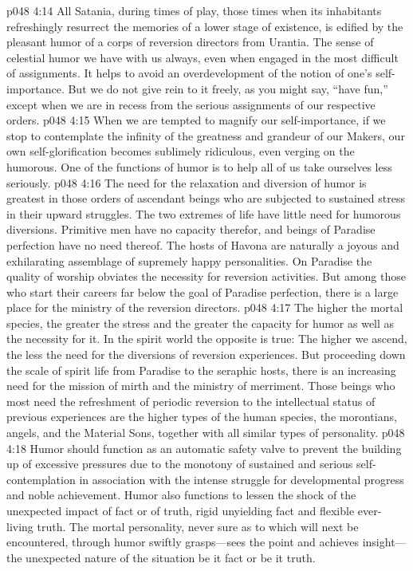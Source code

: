 \pc \vs p048 4:14 All Satania, during times of play, those times when its inhabitants refreshingly resurrect the memories of a lower stage of existence, is edified by the pleasant humor of a corps of reversion directors from Urantia. The sense of celestial humor we have with us always, even when engaged in the most difficult of assignments. It helps to avoid an overdevelopment of the notion of one’s self\hyp{}importance. But we do not give rein to it freely, as you might say, “have fun,” except when we are in recess from the serious assignments of our respective orders.
\vs p048 4:15 When we are tempted to magnify our self\hyp{}importance, if we stop to contemplate the infinity of the greatness and grandeur of our Makers, our own self\hyp{}glorification becomes sublimely ridiculous, even verging on the humorous. One of the functions of humor is to help all of us take ourselves less seriously. 
\pc \vs p048 4:16 The need for the relaxation and diversion of humor is greatest in those orders of ascendant beings who are subjected to sustained stress in their upward struggles. The two extremes of life have little need for humorous diversions. Primitive men have no capacity therefor, and beings of Paradise perfection have no need thereof. The hosts of Havona are naturally a joyous and exhilarating assemblage of supremely happy personalities. On Paradise the quality of worship obviates the necessity for reversion activities. But among those who start their careers far below the goal of Paradise perfection, there is a large place for the ministry of the reversion directors.
\vs p048 4:17 The higher the mortal species, the greater the stress and the greater the capacity for humor as well as the necessity for it. In the spirit world the opposite is true: The higher we ascend, the less the need for the diversions of reversion experiences. But proceeding down the scale of spirit life from Paradise to the seraphic hosts, there is an increasing need for the mission of mirth and the ministry of merriment. Those beings who most need the refreshment of periodic reversion to the intellectual status of previous experiences are the higher types of the human species, the morontians, angels, and the Material Sons, together with all similar types of personality.
\vs p048 4:18 Humor should function as an automatic safety valve to prevent the building up of excessive pressures due to the monotony of sustained and serious self\hyp{}contemplation in association with the intense struggle for developmental progress and noble achievement. Humor also functions to lessen the shock of the unexpected impact of fact or of truth, rigid unyielding fact and flexible ever\hyp{}living truth. The mortal personality, never sure as to which will next be encountered, through humor swiftly grasps---sees the point and achieves insight---the unexpected nature of the situation be it fact or be it truth.
